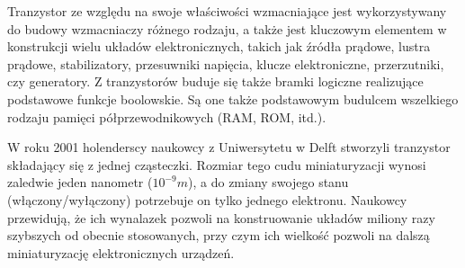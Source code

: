\documentclass[a4paper,11pt]{article}
\begin{document}
Tranzystor ze względu na swoje właściwości wzmacniające jest  wykorzystywany do budowy wzmacniaczy różnego rodzaju, a także jest kluczowym elementem w konstrukcji wielu układów elektronicznych, takich jak źródła prądowe, lustra prądowe, stabilizatory, przesuwniki napięcia, klucze elektroniczne, przerzutniki, czy generatory. Z tranzystorów buduje się także bramki logiczne realizujące podstawowe funkcje boolowskie. Są one także podstawowym budulcem wszelkiego rodzaju pamięci półprzewodnikowych (RAM, ROM, itd.).

 W roku 2001 holenderscy naukowcy z Uniwersytetu w Delft stworzyli tranzystor składający się z jednej cząsteczki. Rozmiar tego cudu miniaturyzacji wynosi zaledwie jeden nanometr ($10^{-9} m$), a do zmiany swojego stanu (włączony/wyłączony) potrzebuje on tylko jednego elektronu. Naukowcy przewidują, że ich wynalazek pozwoli na konstruowanie układów miliony razy szybszych od obecnie stosowanych, przy czym ich wielkość pozwoli na dalszą miniaturyzację elektronicznych urządzeń. 
\end{document}
